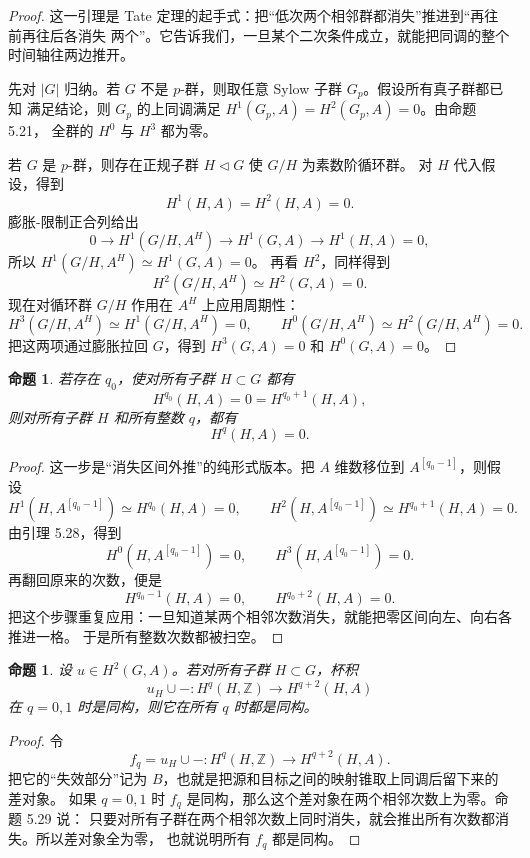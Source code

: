\documentclass[11pt,a4paper,openany]{ctexbook}
\numberwithin{equation}{chapter}
\newcommand{\Z}{\mathbb{Z}}
\theoremstyle{plain}
\newtheorem{proposition}[theorem]{命题}
\theoremstyle{definition}
\theoremstyle{remark}
\begin{document}
\begin{proof}
这一引理是 Tate 定理的起手式：把“低次两个相邻群都消失”推进到“再往前再往后各消失
两个”。它告诉我们，一旦某个二次条件成立，就能把同调的整个时间轴往两边推开。

先对 $|G|$ 归纳。若 $G$ 不是 $p$-群，则取任意 Sylow 子群 $G_p$。假设所有真子群都已知
满足结论，则 $G_p$ 的上同调满足 $H^1(G_p,A)=H^2(G_p,A)=0$。由命题 5.21，
全群的 $H^0$ 与 $H^3$ 都为零。

若 $G$ 是 $p$-群，则存在正规子群 $H\triangleleft G$ 使 $G/H$ 为素数阶循环群。
对 $H$ 代入假设，得到
\[
H^1(H,A)=H^2(H,A)=0.
\]
膨胀-限制正合列给出
\[
0\to H^1(G/H,A^H)\to H^1(G,A)\to H^1(H,A)=0,
\]
所以 $H^1(G/H,A^H)\simeq H^1(G,A)=0$。
再看 $H^2$，同样得到
\[
H^2(G/H,A^H)\simeq H^2(G,A)=0.
\]
现在对循环群 $G/H$ 作用在 $A^H$ 上应用周期性：
\[
H^3(G/H,A^H)\simeq H^1(G/H,A^H)=0,\qquad
H^0(G/H,A^H)\simeq H^2(G/H,A^H)=0.
\]
把这两项通过膨胀拉回 $G$，得到 $H^3(G,A)=0$ 和 $H^0(G,A)=0$。
\end{proof}

\begin{proposition}
若存在 $q_0$，使对所有子群 $H\subset G$ 都有
\[
 H^{q_0}(H,A)=0=H^{q_0+1}(H,A),
\]
则对所有子群 $H$ 和所有整数 $q$，都有
\[
 H^q(H,A)=0.
\]
\end{proposition}

\begin{proof}
这一步是“消失区间外推”的纯形式版本。把 $A$ 维数移位到 $A^{[q_0-1]}$，则假设
\[
H^1(H,A^{[q_0-1]})\simeq H^{q_0}(H,A)=0,\qquad
H^2(H,A^{[q_0-1]})\simeq H^{q_0+1}(H,A)=0.
\]
由引理 5.28，得到
\[
H^0(H,A^{[q_0-1]})=0,\qquad H^3(H,A^{[q_0-1]})=0.
\]
再翻回原来的次数，便是
\[
H^{q_0-1}(H,A)=0,\qquad H^{q_0+2}(H,A)=0.
\]
把这个步骤重复应用：一旦知道某两个相邻次数消失，就能把零区间向左、向右各推进一格。
于是所有整数次数都被扫空。
\end{proof}

\begin{proposition}
设 $u\in H^2(G,A)$。若对所有子群 $H\subset G$，杯积
\[
 u_H\cup -:H^q(H,\Z)\to H^{q+2}(H,A)
\]
在 $q=0,1$ 时是同构，则它在所有 $q$ 时都是同构。
\end{proposition}

\begin{proof}
令
\[
f_q=u_H\cup-:H^q(H,\Z)\to H^{q+2}(H,A).
\]
把它的“失效部分”记为 $B$，也就是把源和目标之间的映射锥取上同调后留下来的差对象。
如果 $q=0,1$ 时 $f_q$ 是同构，那么这个差对象在两个相邻次数上为零。命题 5.29 说：
只要对所有子群在两个相邻次数上同时消失，就会推出所有次数都消失。所以差对象全为零，
也就说明所有 $f_q$ 都是同构。
\end{proof}
\end{document}
